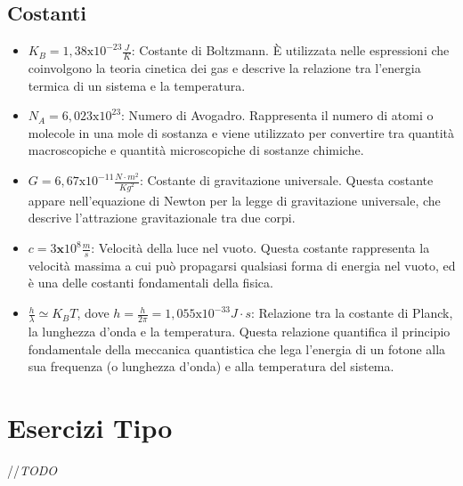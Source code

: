 \documentclass{article}
\begin{document}
\subsection{Costanti}
\begin{itemize}
    \item  \(K_B = 1,38 \text{x} 10 ^ {-23} \frac{J}{K}\): Costante di Boltzmann. È utilizzata nelle espressioni che coinvolgono la teoria cinetica dei gas e descrive la relazione tra l'energia termica di un sistema e la temperatura.
    \item \( N_A = 6,023 \text{x} 10 ^ {23} \): Numero di Avogadro. Rappresenta il numero di atomi o molecole in una mole di sostanza e viene utilizzato per convertire tra quantità macroscopiche e quantità microscopiche di sostanze chimiche.
    \item \( G = 6,67 \text{x} 10 ^ {-11} \frac{N \cdot m^2}{Kg^2}\): Costante di gravitazione universale. Questa costante appare nell'equazione di Newton per la legge di gravitazione universale, che descrive l'attrazione gravitazionale tra due corpi.
    \item \( c = 3 \textbf{x} 10 ^ 8 \frac{m}{s}\): Velocità della luce nel vuoto. Questa costante rappresenta la velocità massima a cui può propagarsi qualsiasi forma di energia nel vuoto, ed è una delle costanti fondamentali della fisica.
    \item \( \frac{h}{\lambda} \simeq K_BT\), dove \(h = \frac{h}{2 \pi} = 1,055 \text{x} 10 ^ {-33} J \cdot s\): Relazione tra la costante di Planck, la lunghezza d'onda e la temperatura. Questa relazione quantifica il principio fondamentale della meccanica quantistica che lega l'energia di un fotone alla sua frequenza (o lunghezza d'onda) e alla temperatura del sistema.
\end{itemize}
\newpage
\section{Esercizi Tipo}
//\textit{TODO}
\end{document}
